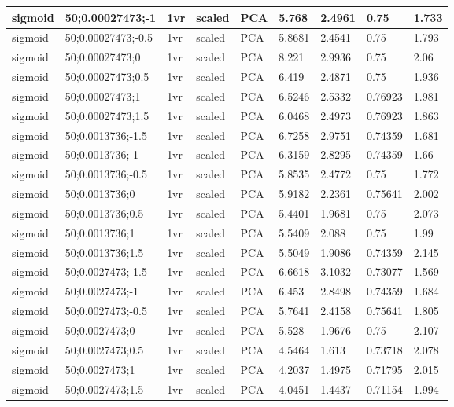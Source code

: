 \begin{longtable}{lllllllll}
sigmoid & 50;0.00027473;-1 & 1vr & scaled & PCA & 5.768 & 2.4961 & 0.75 & 1.733\\ \hline
sigmoid & 50;0.00027473;-0.5 & 1vr & scaled & PCA & 5.8681 & 2.4541 & 0.75 & 1.793\\ \hline
sigmoid & 50;0.00027473;0 & 1vr & scaled & PCA & 8.221 & 2.9936 & 0.75 & 2.06\\ \hline
sigmoid & 50;0.00027473;0.5 & 1vr & scaled & PCA & 6.419 & 2.4871 & 0.75 & 1.936\\ \hline
sigmoid & 50;0.00027473;1 & 1vr & scaled & PCA & 6.5246 & 2.5332 & 0.76923 & 1.981\\ \hline
sigmoid & 50;0.00027473;1.5 & 1vr & scaled & PCA & 6.0468 & 2.4973 & 0.76923 & 1.863\\ \hline
sigmoid & 50;0.0013736;-1.5 & 1vr & scaled & PCA & 6.7258 & 2.9751 & 0.74359 & 1.681\\ \hline
sigmoid & 50;0.0013736;-1 & 1vr & scaled & PCA & 6.3159 & 2.8295 & 0.74359 & 1.66\\ \hline
sigmoid & 50;0.0013736;-0.5 & 1vr & scaled & PCA & 5.8535 & 2.4772 & 0.75 & 1.772\\ \hline
sigmoid & 50;0.0013736;0 & 1vr & scaled & PCA & 5.9182 & 2.2361 & 0.75641 & 2.002\\ \hline
sigmoid & 50;0.0013736;0.5 & 1vr & scaled & PCA & 5.4401 & 1.9681 & 0.75 & 2.073\\ \hline
sigmoid & 50;0.0013736;1 & 1vr & scaled & PCA & 5.5409 & 2.088 & 0.75 & 1.99\\ \hline
sigmoid & 50;0.0013736;1.5 & 1vr & scaled & PCA & 5.5049 & 1.9086 & 0.74359 & 2.145\\ \hline
sigmoid & 50;0.0027473;-1.5 & 1vr & scaled & PCA & 6.6618 & 3.1032 & 0.73077 & 1.569\\ \hline
sigmoid & 50;0.0027473;-1 & 1vr & scaled & PCA & 6.453 & 2.8498 & 0.74359 & 1.684\\ \hline
sigmoid & 50;0.0027473;-0.5 & 1vr & scaled & PCA & 5.7641 & 2.4158 & 0.75641 & 1.805\\ \hline
sigmoid & 50;0.0027473;0 & 1vr & scaled & PCA & 5.528 & 1.9676 & 0.75 & 2.107\\ \hline
sigmoid & 50;0.0027473;0.5 & 1vr & scaled & PCA & 4.5464 & 1.613 & 0.73718 & 2.078\\ \hline
sigmoid & 50;0.0027473;1 & 1vr & scaled & PCA & 4.2037 & 1.4975 & 0.71795 & 2.015\\ \hline
sigmoid & 50;0.0027473;1.5 & 1vr & scaled & PCA & 4.0451 & 1.4437 & 0.71154 & 1.994\\ \hline

\end{longtable}
